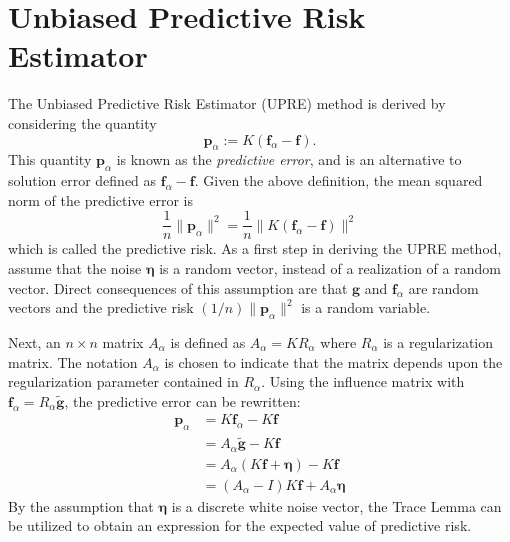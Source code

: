 \documentclass[12pt]{book}
\newcommand{\gVec}{\mathbf{g}}	%
\newcommand{\gnoiseVec}{\widetilde{\mathbf{g}}}	%
\newcommand{\kMat}{K}	%
\newcommand{\fVec}{\mathbf{f}}	%
\newcommand{\regparam}{\alpha}
\newcommand{\R}{R_{\regparam}}	%
\newcommand{\freg}{\fVec_{\regparam}}	%
\newcommand{\noise}{\eta}	%
\newcommand{\noiseVec}{\bm{\noise}}	%
\newcommand{\PE}{\mathbf{p}_{\regparam}}	%
\newcommand{\A}{A_{\regparam}}	%
\begin{document}
\section{Unbiased Predictive Risk Estimator} \label{sec:Unbiased Predictive Risk Estimator}
The Unbiased Predictive Risk Estimator (UPRE) method is derived by considering the quantity
\[\PE := \kMat(\freg - \fVec).\]
This quantity $\PE$ is known as the \textit{predictive error}, and is an alternative to solution error defined as $\freg - \fVec$. Given the above definition, the mean squared norm of the predictive error is
\[\frac{1}{n}\|\PE\|^2 = \frac{1}{n}\|\kMat(\freg - \fVec)\|^2\]
which is called the predictive risk.  As a first step in deriving the UPRE method, assume that the noise $\noiseVec$ is a random vector, instead of a realization of a random vector. Direct consequences of this assumption are that $\gVec$ and $\freg$ are random vectors and the predictive risk $(1/n)\|\PE\|^2$ is a random variable. \par
Next, an $n \times n$ matrix $\A$ is defined as $\A = \kMat\R$ where $\R$ is a regularization matrix. The notation $\A$ is chosen to indicate that the matrix depends upon the regularization parameter contained in $\R$. Using the influence matrix with $\freg = \R\gnoiseVec$, the predictive error can be rewritten:
\begin{align*}
\PE &= \kMat\freg - \kMat\fVec \\
&= \A\gnoiseVec - \kMat\fVec \\
&= \A(\kMat\fVec + \noiseVec) - \kMat\fVec \\
&= (\A - I)\kMat\fVec + \A\noiseVec
\end{align*}
By the assumption that $\noiseVec$ is a discrete white noise vector, the Trace Lemma can be utilized to obtain an expression for the expected value of predictive risk.
\end{document}
